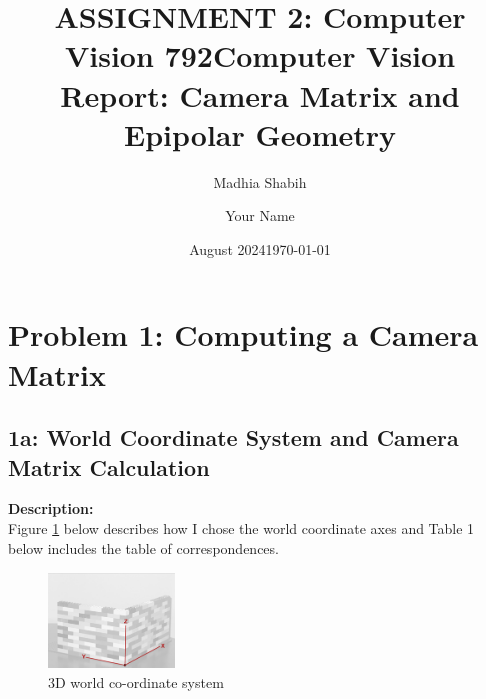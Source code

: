 \documentclass{article}
\title{ASSIGNMENT 2: Computer Vision 792}
\author{Madhia Shabih}
\date{August 2024}
\title{Computer Vision Report: Camera Matrix and Epipolar Geometry}
\author{Your Name}
\date{\today}
\begin{document}
\maketitle

\section{Problem 1: Computing a Camera Matrix}

\subsection{1a: World Coordinate System and Camera Matrix Calculation}
\textbf{Description:} \\
Figure \ref{fig:lego1} below describes how I chose the world coordinate axes and Table 1 below includes the table of correspondences.  
\begin{figure}[H] %
    \centering
    \includegraphics[width=0.3\textwidth]{axis.png} %
    \caption{3D world co-ordinate system}
    \label{fig:lego1}
\end{figure}
\end{document}
